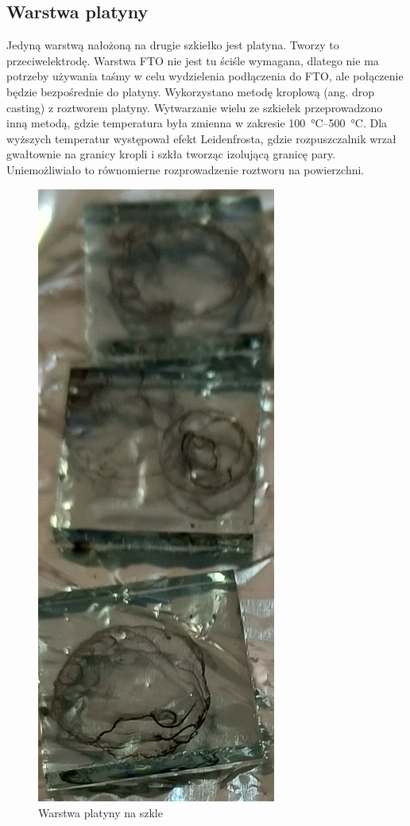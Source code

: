 \documentclass[12pt]{article}
\begin{document}
	\subsection{Warstwa platyny}
	Jedyną warstwą nałożoną na drugie szkiełko jest platyna. Tworzy to przeciwelektrodę. Warstwa FTO nie jest tu ściśle wymagana, dlatego nie ma potrzeby używania taśmy w celu wydzielenia podłączenia do FTO, ale połączenie będzie bezpośrednie do platyny. Wykorzystano metodę kroplową (ang. drop casting) z roztworem platyny. Wytwarzanie wielu ze szkiełek przeprowadzono inną metodą, gdzie temperatura była zmienna w zakresie \qtyrange{100}{500}{\degreeCelsius}. Dla wyższych temperatur występował efekt Leidenfrosta, gdzie rozpuszczalnik wrzał gwałtownie na granicy kropli i szkła tworząc izolującą granicę pary. Uniemożliwiało to równomierne rozprowadzenie roztworu na powierzchni. 
	\begin{figure}[H]
		\centering
		\includegraphics[angle=90, width=0.7\textwidth]{probki_platyna.png}
		\caption{Warstwa platyny na szkle}
	\end{figure}
	
\end{document}
